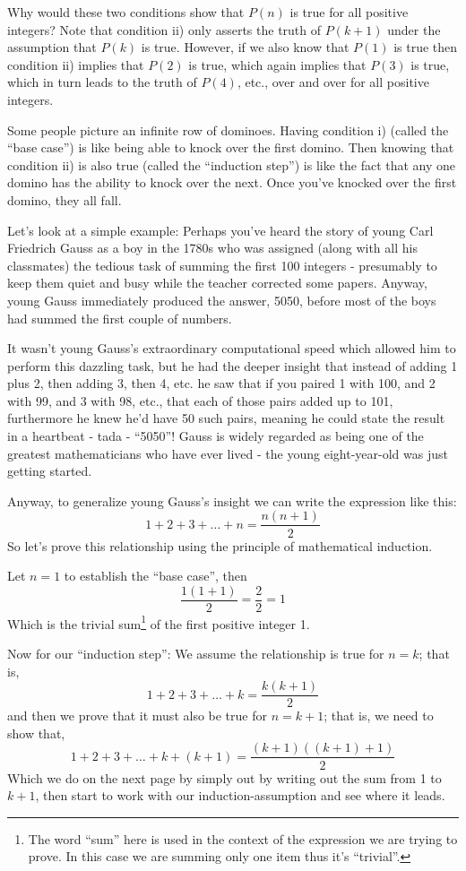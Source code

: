 \documentclass{article}
\begin{document}
Why would these two conditions show that $P(n)$ is true for all
positive integers? Note that condition ii) only asserts the truth
of $P(k+1)$ under the assumption that $P(k)$ is true.
However, if we also know that $P(1)$ is true then condition ii) implies that $P(2)$ is true,
which again implies that $P(3)$ is true,
which in turn leads to the truth of $P(4)$,
etc., over and over for all positive integers.

Some people picture an infinite row of dominoes.
Having condition i) (called the ``base case'') is like being
able to knock over the first domino.
Then knowing that condition ii) is also true (called the ``induction step'') is like the
fact that any one domino has the ability to knock over the next.
Once you've knocked over the first domino,
they all fall.

Let's look at a simple example:
Perhaps you've heard the story of young Carl Friedrich Gauss
as a boy in
the 1780s who was assigned (along with all his classmates)
the tedious task of summing the first 100 integers -
presumably to keep them quiet and busy while the
teacher corrected some papers. Anyway,
young Gauss immediately produced the answer,
5050, before most of the boys had summed the first couple of numbers.

It wasn't young Gauss's extraordinary computational speed which allowed
him to perform this dazzling task,
but he had the deeper insight that instead of adding 1 plus 2,
then adding 3, then 4, etc.
he saw that if you paired 1 with 100,
and 2 with 99,
and 3 with 98,
etc.,
that each of those pairs added up to 101,
furthermore he knew he'd have 50 such pairs,
meaning he could state the result in a heartbeat - tada - ``5050''!
Gauss is widely regarded as being one of the greatest
mathematicians who have ever lived - the young eight-year-old was just getting started.

Anyway,
to generalize young Gauss's insight we can write the expression like this:
\[1+2+3+\ldots+n=\frac{n(n+1)}{2}\]
So let's prove this relationship using the principle of mathematical induction.
\bigskip

Let $n=1$ to establish the ``base case'',
then
\[\frac{1(1+1)}{2}=\frac{2}{2}=1\]
Which is the trivial sum\footnote{The word ``sum'' here is used
in the context of the expression
we are trying to prove. In this case we are summing
only one item thus it's ``trivial''.} of the first positive integer 1.

Now for our ``induction step'': We assume the relationship is true for $n=k$; that is,
\[1+2+3+\ldots+k=\frac{k(k+1)}{2}\]
and then we prove that it must also be true
for $n=k+1$; that is, we need to show that,
\[1+2+3+\ldots+k+(k+1)=\frac{(k+1)((k+1)+1)}{2}\]
Which we do on the next page by simply out by writing out the sum from 1 to \(k+1\), then
start to work with our induction-assumption and see where it leads.
\end{document}
